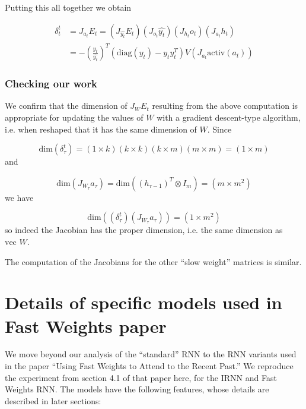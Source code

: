 Putting this all together we obtain

\begin{align*}
  \delta_t^t & = J_{a_t} E_t = (J_{\widehat{y_t}} E_t)(J_{o_t}\widehat{y_t})(J_{h_t}o_t)(J_{a_t}h_t) \\
  & = -\left(\frac{y_t}{\widehat{y_t}}\right)^T \left(\mbox{diag}(y_t) - y_t y_t^T\right) V \left(J_{a_t}\mbox{activ}(a_t)\right)
\end{align*}

\subsubsection{Checking our work}

We confirm that the dimension of $J_W E_t$ resulting from the above computation is appropriate for updating the values of $W$ with a gradient descent-type algorithm, i.e. when reshaped that it has the same dimension of $W$. Since

\begin{equation*}
\mbox{dim}(\delta_\tau^t) = (1 \times k)(k \times k)(k \times m)(m \times m) = (1 \times m)
\end{equation*}
%
and

\begin{equation*}
\mbox{dim}(J_{W_\tau} a_\tau) = \mbox{dim}((h_{\tau - 1})^T \otimes I_m) = (m \times m^2)
\end{equation*}
%
we have

\begin{equation*}
\mbox{dim}((\delta_\tau^t)(J_{W_\tau} a_\tau)) = (1 \times m^2)
\end{equation*}
%
so indeed the Jacobian has the proper dimension, i.e. the same dimension as $\mbox{vec } W$.

The computation of the Jacobians for the other ``slow weight'' matrices is similar.

\section{Details of specific models used in Fast Weights paper}

We move beyond our analysis of the ``standard'' RNN to the RNN variants used in the paper ``Using Fast Weights to Attend to the Recent Past.'' We reproduce the experiment from section 4.1 of that paper here, for the IRNN and Fast Weights RNN. The models have the following features, whose details are described in later sections:

